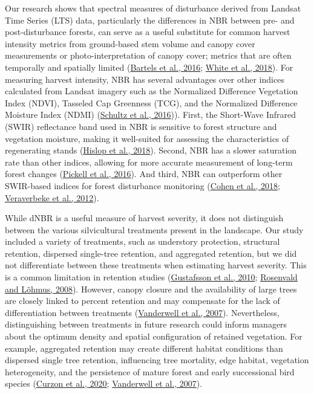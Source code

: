 \documentclass[
  12pt,
]{article}
\begin{document}
Our research shows that spectral measures of disturbance derived from Landsat Time Series (LTS) data, particularly the differences in NBR between pre- and post-disturbance forests, can serve as a useful substitute for common harvest intensity metrics from ground-based stem volume and canopy cover measurements or photo-interpretation of canopy cover; metrics that are often temporally and spatially limited (\protect\hyperlink{ref-bartelsTrendsPostdisturbanceRecovery2016}{Bartels et al., 2016}; \protect\hyperlink{ref-whiteConfirmationPostharvestSpectral2018}{White et al., 2018}). For measuring harvest intensity, NBR has several advantages over other indices calculated from Landsat imagery such as the Normalized Difference Vegetation Index (NDVI), Tasseled Cap Greenness (TCG), and the Normalized Difference Moisture Index (NDMI) (\protect\hyperlink{ref-schultzPerformanceVegetationIndices2016}{Schultz et al., 2016})). First, the Short-Wave Infrared (SWIR) reflectance band used in NBR is sensitive to forest structure and vegetation moisture, making it well-suited for assessing the characteristics of regenerating stands (\protect\hyperlink{ref-hislopUsingLandsatSpectral2018}{Hislop et al., 2018}). Second, NBR has a slower saturation rate than other indices, allowing for more accurate measurement of long-term forest changes (\protect\hyperlink{ref-pickellForestRecoveryTrends2016}{Pickell et al., 2016}). And third, NBR can outperform other SWIR-based indices for forest disturbance monitoring (\protect\hyperlink{ref-cohenLandTrendrMultispectralEnsemble2018}{Cohen et al., 2018}; \protect\hyperlink{ref-veraverbekeEvaluationPrePostfire2012}{Veraverbeke et al., 2012}).

While dNBR is a useful measure of harvest severity, it does not distinguish between the various silvicultural treatments present in the landscape. Our study included a variety of treatments, such as understory protection, structural retention, dispersed single-tree retention, and aggregated retention, but we did not differentiate between these treatments when estimating harvest severity. This is a common limitation in retention studies (\protect\hyperlink{ref-gustafssonTreeRetentionConservation2010}{Gustafsson et al., 2010}; \protect\hyperlink{ref-Rosenvald2008a}{Rosenvald and Lõhmus, 2008}). However, canopy closure and the availability of large trees are closely linked to percent retention and may compensate for the lack of differentiation between treatments (\protect\hyperlink{ref-VANDERWEL2007}{Vanderwell et al., 2007}). Nevertheless, distinguishing between treatments in future research could inform managers about the optimum density and spatial configuration of retained vegetation. For example, aggregated retention may create different habitat conditions than dispersed single tree retention, influencing tree mortality, edge habitat, vegetation heterogeneity, and the persistence of mature forest and early successional bird species (\protect\hyperlink{ref-CurzonKern2020}{Curzon et al., 2020}; \protect\hyperlink{ref-VANDERWEL2007}{Vanderwell et al., 2007}).
\end{document}
